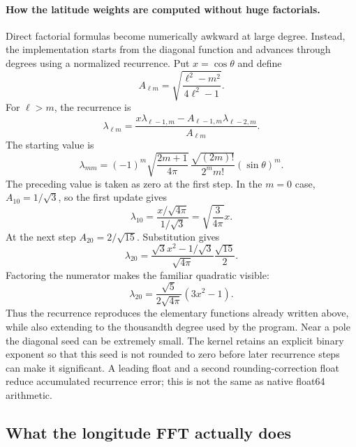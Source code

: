 \paragraph{How the latitude weights are computed without huge factorials.}
Direct factorial formulas become numerically awkward at large degree.
Instead, the implementation starts from the diagonal function and advances
through degrees using a normalized recurrence. Put $x=\cos\theta$ and define
\begin{equation}
 A_{\ell m}=\sqrt{\frac{\ell^2-m^2}{4\ell^2-1}}.
\end{equation}
For $\ell>m$, the recurrence is
\begin{equation}
 \lambda_{\ell m}
 =\frac{x\lambda_{\ell-1,m}-A_{\ell-1,m}\lambda_{\ell-2,m}}
 {A_{\ell m}}.
\end{equation}
The starting value is
\begin{equation}
 \lambda_{mm}=(-1)^m
 \sqrt{\frac{2m+1}{4\pi}}\,
 \frac{\sqrt{(2m)!}}{2^m m!}(\sin\theta)^m.
\end{equation}
The preceding value is taken as zero at the first step. In the $m=0$
case, $A_{10}=1/\sqrt{3}$, so the first update gives
\begin{equation}
 \lambda_{10}=\frac{x/\sqrt{4\pi}}{1/\sqrt{3}}
              =\sqrt{\frac{3}{4\pi}}x.
\end{equation}
At the next step $A_{20}=2/\sqrt{15}$. Substitution gives
\begin{equation}
 \lambda_{20}=\frac{\sqrt{3}x^2-1/\sqrt{3}}
 {\sqrt{4\pi}}\frac{\sqrt{15}}{2}.
\end{equation}
Factoring the numerator makes the familiar quadratic visible:
\begin{equation}
 \lambda_{20}=\frac{\sqrt{5}}{2\sqrt{4\pi}}(3x^2-1).
\end{equation}
Thus the recurrence reproduces the elementary functions already written
above, while also extending to the thousandth degree used by the program.
Near a pole the diagonal seed can be extremely small. The kernel retains
an explicit binary exponent so that this seed is not rounded to zero
before later recurrence steps can make it significant. A leading float
and a second rounding-correction float reduce accumulated recurrence
error; this is not the same as native float64 arithmetic.

\subsection{What the longitude FFT actually does}


